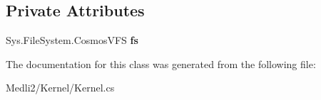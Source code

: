 \subsection*{Private Attributes}
\begin{DoxyCompactItemize}
\item 
\mbox{\label{class_medli_1_1_kernel_aac28d0f8037d8fc4ff515baa5126eaff}} 
Sys.\+File\+System.\+Cosmos\+V\+FS {\bfseries fs}
\end{DoxyCompactItemize}


The documentation for this class was generated from the following file\+:\begin{DoxyCompactItemize}
\item 
Medli2/\+Kernel/Kernel.\+cs\end{DoxyCompactItemize}
